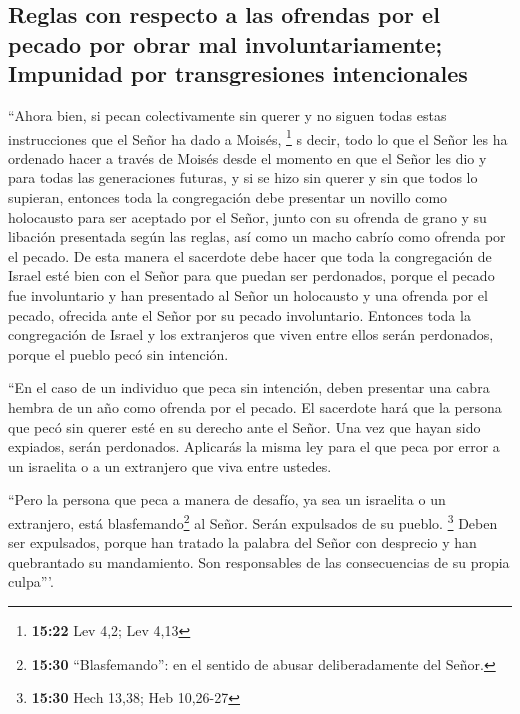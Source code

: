 \hypertarget{reglas-con-respecto-a-las-ofrendas-por-el-pecado-por-obrar-mal-involuntariamente-impunidad-por-transgresiones-intencionales}{%
\subsection{Reglas con respecto a las ofrendas por el pecado por obrar
mal involuntariamente; Impunidad por transgresiones
intencionales}\label{reglas-con-respecto-a-las-ofrendas-por-el-pecado-por-obrar-mal-involuntariamente-impunidad-por-transgresiones-intencionales}}

 ``Ahora bien, si pecan colectivamente sin querer y no
siguen todas estas instrucciones que el Señor ha dado a Moisés,
\footnote{\textbf{15:22} Lev 4,2; Lev 4,13}  s decir,
todo lo que el Señor les ha ordenado hacer a través de Moisés desde el
momento en que el Señor les dio y para todas las generaciones futuras,
 y si se hizo sin querer y sin que todos lo supieran,
entonces toda la congregación debe presentar un novillo como holocausto
para ser aceptado por el Señor, junto con su ofrenda de grano y su
libación presentada según las reglas, así como un macho cabrío como
ofrenda por el pecado.  De esta manera el sacerdote debe
hacer que toda la congregación de Israel esté bien con el Señor para que
puedan ser perdonados, porque el pecado fue involuntario y han
presentado al Señor un holocausto y una ofrenda por el pecado, ofrecida
ante el Señor por su pecado involuntario.  Entonces toda
la congregación de Israel y los extranjeros que viven entre ellos serán
perdonados, porque el pueblo pecó sin intención.

 ``En el caso de un individuo que peca sin intención,
deben presentar una cabra hembra de un año como ofrenda por el pecado.
 El sacerdote hará que la persona que pecó sin querer
esté en su derecho ante el Señor. Una vez que hayan sido expiados, serán
perdonados.  Aplicarás la misma ley para el que peca por
error a un israelita o a un extranjero que viva entre ustedes.

 ``Pero la persona que peca a manera de desafío, ya sea
un israelita o un extranjero, está blasfemando\footnote{\textbf{15:30}
  ``Blasfemando'': en el sentido de abusar deliberadamente del Señor.}
al Señor. Serán expulsados de su pueblo. \footnote{\textbf{15:30} Hech
  13,38; Heb 10,26-27}  Deben ser expulsados, porque han
tratado la palabra del Señor con desprecio y han quebrantado su
mandamiento. Son responsables de las consecuencias de su propia
culpa'''.

